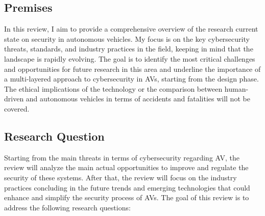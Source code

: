 \subsection{Premises}\label{subsec:premises}

In this review,
I aim to provide a comprehensive overview of the research current state on security in autonomous vehicles.
My focus is on the key cybersecurity threats, standards, and industry practices in the field,
keeping in mind that the landscape is rapidly evolving.
The goal is to identify the most critical challenges and opportunities for future research in this area
and underline the importance of a multi-layered approach to cybersecurity in AVs, starting from the design phase.
The ethical implications of the technology or the comparison between human-driven and autonomous vehicles in terms of accidents and fatalities will not be covered.

\subsection{Research Question}\label{subsec:research-question}

Starting from the main threats in terms of cybersecurity regarding AV, the review will analyze the main actual opportunities to improve and regulate the security of these systems.
After that, the review will focus on the industry practices concluding in the future trends and emerging technologies that could enhance and simplify the security process of AVs.
The goal of this review is to address the following research questions:

